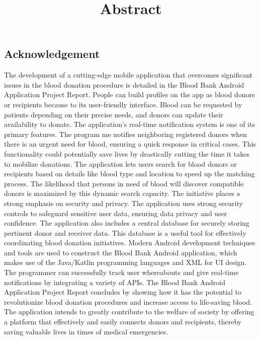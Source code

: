 \title{Abstract}
\begin{center}
    \section*{Acknowledgement}
\end{center}
\vspace{5.5mm}
The development of a cutting-edge mobile application that overcomes significant issues in the blood
donation procedure is detailed in the Blood Bank Android Application Project Report. People can build
profiles on the app as blood donors or recipients because to its user-friendly interface. Blood can be
requested by patients depending on their precise needs, and donors can update their availability to
donate. The application's real-time notification system is one of its primary features. The program me
notifies neighboring registered donors when there is an urgent need for blood, ensuring a quick response
in critical cases. This functionality could potentially save lives by drastically cutting the time it takes to
mobilize donations. The application lets users search for blood donors or recipients based on details like
blood type and location to speed up the matching process. The likelihood that persons in need of blood
will discover compatible donors is maximized by this dynamic search capacity. The initiative places a 
strong emphasis on security and privacy. The application uses strong security controls to safeguard
sensitive user data, ensuring data privacy and user confidence. The application also includes a central
database for securely storing pertinent donor and receiver data. This database is a useful tool for
effectively coordinating blood donation initiatives. Modern Android development techniques and tools
are used to construct the Blood Bank Android application, which makes use of the Java/Katlin
programming languages and XML for UI design. The programmer can successfully track user whereabouts
and give real-time notifications by integrating a variety of APIs. The Blood Bank Android Application
Project Report concludes by showing how it has the potential to revolutionize blood donation procedures
and increase access to life-saving blood. The application intends to greatly contribute to the welfare of
society by offering a platform that effectively and easily connects donors and recipients, thereby saving
valuable lives in times of medical emergencies.